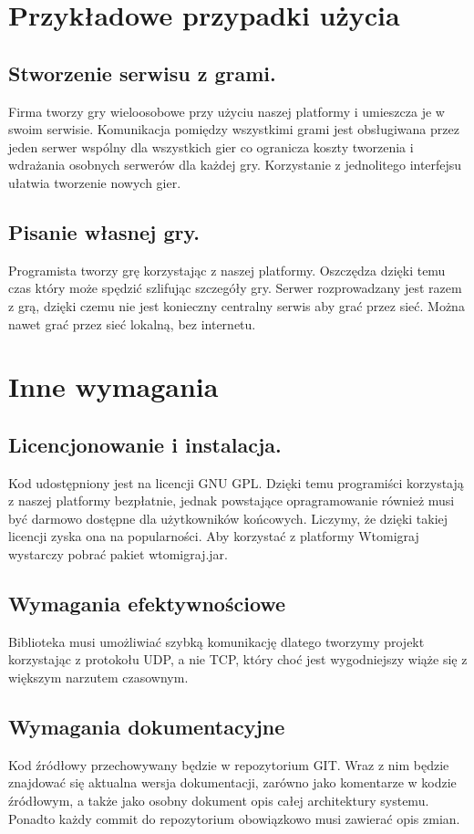 \documentclass[a4paper, 12pt]{article}
\begin{document}
\section[Przykładowe przypadki użycia]{Przykładowe przypadki użycia}
\subsection{Stworzenie serwisu z grami.} Firma tworzy gry wieloosobowe przy użyciu naszej platformy i umieszcza je w swoim serwisie. Komunikacja pomiędzy wszystkimi grami jest obsługiwana przez jeden serwer wspólny dla wszystkich gier co ogranicza koszty tworzenia i wdrażania osobnych serwerów dla każdej gry. Korzystanie z jednolitego interfejsu ułatwia tworzenie nowych gier.
\subsection{Pisanie własnej gry.} Programista tworzy grę korzystając z naszej platformy. Oszczędza dzięki temu czas który może spędzić szlifując szczegóły gry. Serwer rozprowadzany jest razem z grą, dzięki czemu nie jest konieczny centralny serwis aby grać przez sieć. Można nawet grać przez sieć lokalną, bez internetu.

\section{Inne wymagania}
\subsection{Licencjonowanie i instalacja.}
Kod udostępniony jest na licencji GNU GPL. Dzięki temu programiści korzystają z naszej platformy bezpłatnie, jednak powstające opragramowanie również musi być darmowo dostępne dla użytkowników końcowych. Liczymy, że dzięki takiej licencji zyska ona na popularności. Aby korzystać z platformy Wtomigraj wystarczy pobrać pakiet wtomigraj.jar. 


\subsection{Wymagania efektywnościowe}
Biblioteka musi umożliwiać szybką komunikację dlatego tworzymy projekt korzystając z protokołu UDP, a nie TCP, który choć jest wygodniejszy wiąże się z większym narzutem czasownym.

\subsection[Wymagania dokumentacyjne]{Wymagania dokumentacyjne}
Kod źródłowy przechowywany będzie w repozytorium GIT. Wraz z nim będzie znajdować się aktualna wersja dokumentacji, zarówno jako komentarze w kodzie źródłowym, a także jako osobny dokument opis całej architektury systemu. Ponadto każdy commit do repozytorium obowiązkowo musi zawierać opis zmian.
\end{document}
